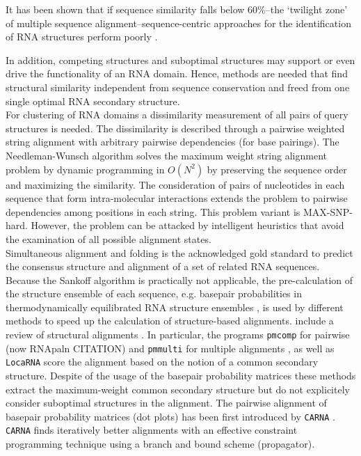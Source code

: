 \documentclass[a4paper,11pt]{article}
\newcommand\pmcomp{\texttt{pmcomp}}
\newcommand\pmmulti{\texttt{pmmulti}}
\newcommand\locarna{\texttt{LocaRNA}}
\newcommand\carna{\texttt{CARNA}}
\begin{document}
It has been shown that if sequence similarity falls below 60\%--the 
`twilight zone' of multiple sequence alignment--sequence-centric approaches 
for the identification of RNA structures perform poorly  \cite{Gardner15860779}. 

In addition, competing structures and
suboptimal structures may support or even drive the functionality of an RNA
domain. Hence, methods are needed that find structural similarity independent
from sequence conservation and freed from one single optimal RNA secondary
structure.\\

For clustering of RNA domains a dissimilarity measurement of all pairs of query
structures is needed. The dissimilarity is described through a pairwise weighted
string alignment with arbitrary pairwise dependencies (for base pairings). The
Needleman-Wunsch algorithm solves the maximum weight string alignment
problem by dynamic programming in $O(N^2)$ by preserving the sequence order and
maximizing the similarity. The consideration of pairs of nucleotides in each
sequence that form intra-molecular interactions extends the problem to pairwise
dependencies among positions in each string. This problem variant is
MAX-SNP-hard. However, the problem can be attacked by intelligent heuristics
that avoid the examination of all possible alignment states.\\

Simultaneous alignment and folding \cite{sankoff85} is the acknowledged gold
standard to predict the consensus structure and alignment of a set of related
RNA sequences. Because the Sankoff algorithm is practically not applicable, the
pre-calculation of the structure ensemble of each sequence, e.g. basepair
probabilities in thermodynamically equilibrated RNA structure ensembles
\cite{McCaskill:1990}, is used by different methods to speed up the calculation
of structure-based alignments. {\color{red} include a review of structural alignments }. In particular, the programs \pmcomp{} for pairwise (now RNApaln {\color{red}CITATION}) and
\pmmulti{} for multiple alignments \cite{Hofacker15073017}, as well as
\locarna{} \cite{Will17432929} score the alignment based on the notion of a
common secondary structure. Despite of the usage of the basepair probability
matrices these methods extract the maximum-weight common secondary structure but
do not explicitely consider suboptimal structures in the alignment. The pairwise
alignment of basepair probability matrices (dot plots) has been first introduced
by \carna{} \cite{Palu2010,Sorescu2012}. \carna{} finds iteratively better
alignments with an effective constraint programming technique using a branch and
bound scheme (propagator).\\
\end{document}
